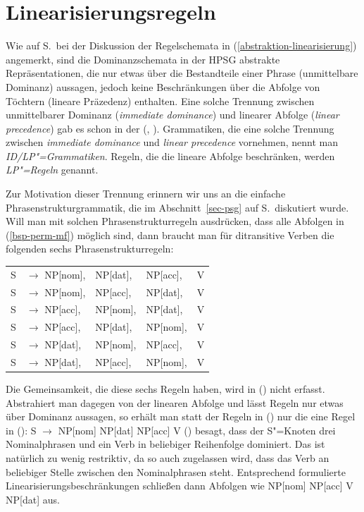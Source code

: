 \section{Linearisierungsregeln}

Wie auf S.\,\pageref{abstraktion-linearisierung} bei der Diskussion der Regelschemata in
(\ref{abstraktion-linearisierung}) angemerkt, sind die Dominanzschemata in der HPSG abstrakte
Repräsentationen, die nur etwas über die Bestandteile einer Phrase (unmittelbare Dominanz)
aussagen, jedoch keine Beschränkungen über die Abfolge von Töchtern (lineare Präzedenz)
enthalten. Eine solche Trennung zwischen unmittelbarer Dominanz (\emph{immediate dominance})
und linearer Abfolge (\emph{linear precedence}) gab es schon in der \gpsg
(\citealt*[Abschnitt~3.2]{GKPS85a}, \citealt[Kapitel~5]{Uszkoreit87a}). Grammatiken, die eine solche Trennung zwischen \emph{immediate dominance} und
\emph{linear precedence} vornehmen, nennt man \emph{ID/LP"=Grammatiken}. Regeln, die die lineare Abfolge
beschränken, werden \emph{LP"=Regeln} genannt.

Zur Motivation dieser Trennung erinnern wir uns an die einfache Phrasenstrukturgrammatik,
die im Abschnitt~\ref{sec-psg} auf S.\,\pageref{ditrans-ps-regeln} diskutiert wurde. Will man
mit solchen Phrasenstrukturregeln ausdrücken, dass alle Abfolgen in (\ref{bsp-perm-mf}) möglich sind,
dann braucht man für ditransitive Verben die folgenden sechs Phrasenstrukturregeln:
\ea
\begin{tabular}[t]{@{}l@{ }l@{ }l@{ }l@{ }l}
S  & $\to$ NP[nom],& NP[dat], & NP[acc], & V\\
S  & $\to$ NP[nom],& NP[acc], & NP[dat], & V\\
S  & $\to$ NP[acc],& NP[nom], & NP[dat], & V\\
S  & $\to$ NP[acc],& NP[dat], & NP[nom], & V\\
S  & $\to$ NP[dat],& NP[nom], & NP[acc], & V\\
S  & $\to$ NP[dat],& NP[acc], & NP[nom], & V\\
\end{tabular}
\z
Die Gemeinsamkeit, die diese sechs Regeln haben, wird in () nicht erfasst. Abstrahiert man
dagegen von der linearen Abfolge und lässt Regeln nur etwas über Dominanz aussagen, so erhält man
statt der Regeln in () nur die eine Regel in ():
 \ea
S $\to$ NP[nom] NP[dat] NP[acc] V
\z
() besagt, dass der S"=Knoten drei Nominalphrasen und ein Verb in beliebiger Reihenfolge
dominiert. Das ist natürlich zu wenig restriktiv, da so auch zugelassen wird, dass das Verb an beliebiger
Stelle zwischen den Nominalphrasen steht. Entsprechend formulierte Linearisierungsbeschränkungen
schließen dann Abfolgen wie NP[nom] NP[acc] V NP[dat] aus.

